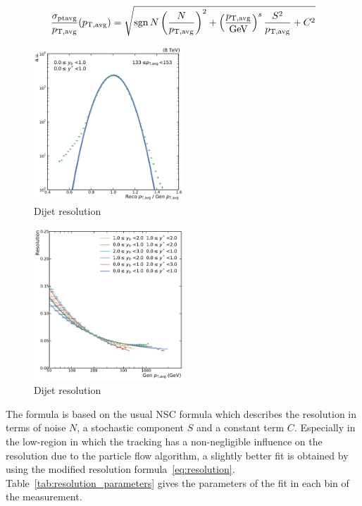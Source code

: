 \begin{equation}
    \frac{\sigma_{\text{ptavg}}}{p_{\mathrm{T,avg}}} (p_{\mathrm{T,avg}}) = \sqrt{\operatorname{sgn}{N} \left(\frac{N}{p_{\mathrm{T,avg}}}\right)^2 + \left(\frac{p_{\mathrm{T,avg}}}{\text{GeV}}\right)^s \frac{S^2}{p_{\mathrm{T,avg}}} + C^2 }
    \label{eq:resolution}
\end{equation}

\begin{figure}[htbp]
    \centering
    \includegraphics[width=0.5\textwidth]{figures/measurement/resolution_yb0ys0_bin10.pdf}
    \caption{Dijet \ptavg resolution}
    \label{fig:resolution_bin}
\end{figure}


\begin{figure}[htbp]
    \centering
    \includegraphics[width=0.5\textwidth]{figures/measurement/resolution_ptavg.pdf}
    \caption{Dijet \ptavg resolution}
    \label{fig:resolution_ptavg}
\end{figure}

The formula is based on the usual NSC formula which describes the resolution in
terms of noise $N$, a stochastic component $S$ and a constant term $C$.
Especially in the low-\pt region in which the tracking has a non-negligible
influence on the resolution due to the particle flow algorithm, a slightly
better fit is obtained by using the modified resolution
formula~\ref{eq:resolution}. Table~\ref{tab:resolution_parameters} gives the
parameters of the fit in each bin of the measurement.

